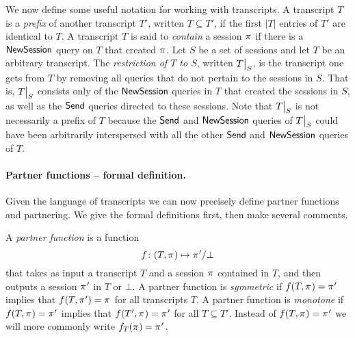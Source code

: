 We now define some useful notation for working with transcripts.
A transcript $T$ is a \emph{prefix} of another transcript $T'$,
written $T \subseteq T'$,
if the first $|T|$ entries of $T'$ are identical to $T$.  
A transcript $T$ is said to \emph{contain} a  session $\oracle$ if there is a $\mathsf{NewSession}$ query on $T$ that created $\oracle$.
Let $S$ be a set of sessions and let $T$ be an arbitrary transcript.
The \emph{restriction of $T$ to $S$},
written $\restrict{T}{S}$,
is the transcript one gets from $T$ by removing all queries that do not pertain to the sessions in $S$.
That is, $\restrict{T}{S}$ consists only of the $\mathsf{NewSession}$ queries in $T$ that created the sessions in $S$,
as well as the $\mathsf{Send}$ queries directed to these sessions.
Note that $\restrict{T}{S}$ is not necessarily a prefix of $T$
because the $\mathsf{Send}$ and $\mathsf{NewSession}$ queries of $\restrict{T}{S}$ could have been arbitrarily interspersed with all the other $\mathsf{Send}$ and $\mathsf{NewSession}$ queries of $T$.

\paragraph{Partner functions -- formal definition.}
Given the language of transcripts we can now precisely define partner functions and partnering.
We give the formal definitions first,
then make several comments.


\begin{definition}\label{def:partner_functions}
A \emph{partner function} is a function 
\begin{equation}
f \colon (T,\oracle) \mapsto  \oracle' / \bot 
\end{equation}
that takes as input a transcript $T$
and a session $\oracle$ contained in $T$,
and then outputs a  session $\oracle'$ in $T$ or $\bot$.
A partner function is \emph{symmetric} if $f(T, \oracle) = \oracle'$ implies  that $f(T,\oracle') = \oracle$ for all transcripts $T$.  
A partner function is \emph{monotone} if $f(T, \oracle) = \oracle'$ implies that $f(T', \oracle) = \oracle'$ for all $T \subseteq T'$.
Instead of $f(T, \oracle) = \oracle'$ we will more commonly write $f_T(\oracle) = \oracle'$.
\end{definition}

